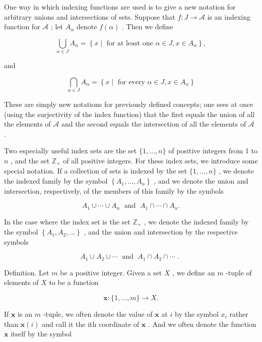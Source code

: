 \documentclass[10pt]{article}
\begin{document}
One way in which indexing functions are used is to give a new notation for arbitrary unions and intersections of sets. Suppose that \(f : J \rightarrow  \mathcal{A}\) is an indexing function for \(\mathcal{A}\) ; let \({A}_{\alpha }\) denote \(f\left( \alpha \right)\) . Then we define

\[
\mathop{\bigcup }\limits_{{\alpha  \in  J}}{A}_{\alpha } = \left\{  {x \mid  \text{ for at least one }\alpha  \in  J,x \in  {A}_{\alpha }}\right\}  ,
\]

and

\[
\mathop{\bigcap }\limits_{{\alpha  \in  J}}{A}_{\alpha } = \left\{  {x \mid  \text{ for every }\alpha  \in  J,x \in  {A}_{\alpha }}\right\}
\]

These are simply new notations for previously defined concepts; one sees at once (using the surjectivity of the index function) that the first equals the union of all the elements of \(\mathcal{A}\) and the second equals the intersection of all the elements of \(\mathcal{A}\) .

Two especially useful index sets are the set \(\{ 1,\ldots ,n\}\) of positive integers from 1 to \(n\) , and the set \({\mathbb{Z}}_{ + }\) of all positive integers. For these index sets, we introduce some special notation. If a collection of sets is indexed by the set \(\{ 1,\ldots ,n\}\) , we denote the indexed family by the symbol \(\left\{  {{A}_{1},\ldots ,{A}_{n}}\right\}\) , and we denote the union and intersection, respectively, of the members of this family by the symbols

\[
{A}_{1} \cup  \cdots  \cup  {A}_{n}\;\text{ and }\;{A}_{1} \cap  \cdots  \cap  {A}_{n}.
\]

In the case where the index set is the set \({\mathbb{Z}}_{ + }\) , we denote the indexed family by the symbol \(\left\{  {{A}_{1},{A}_{2},\ldots }\right\}\) , and the union and intersection by the respective symbols

\[
{A}_{1} \cup  {A}_{2} \cup  \cdots \;\text{ and }\;{A}_{1} \cap  {A}_{2} \cap  \cdots \text{ . }
\]

Definition. Let \(m\) be a positive integer. Given a set \(X\) , we define an \(m\) -tuple of elements of \(X\) to be a function

\[
\mathbf{x} : \{ 1,\ldots ,m\}  \rightarrow  X.
\]

If \(\mathbf{x}\) is an \(m\) -tuple, we often denote the value of \(\mathbf{x}\) at \(i\) by the symbol \({x}_{i}\) rather than \(\mathbf{x}\left( i\right)\) and call it the ith coordinate of \(\mathbf{x}\) . And we often denote the function \(\mathbf{x}\) itself by the symbol
\end{document}
